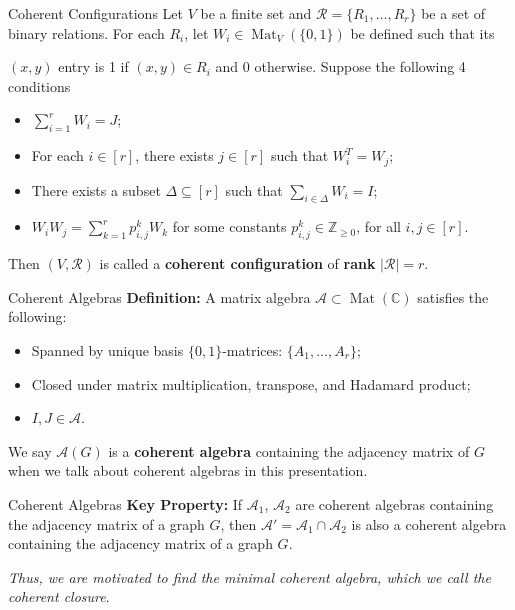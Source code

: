\documentclass{beamer}
\begin{document}
\begin{frame}{Coherent Configurations}
    Let $V$ be a finite set and $\mathcal{R}=\{R_1,\dots,R_r\}$ be a set of binary relations. For each $R_i$, let $W_i\in\operatorname{Mat}_V(\{0,1\})$ be defined such that its 
    
    $(x,y)$ entry is 1 if $(x,y)\in R_i$ and 0 otherwise. Suppose the following 4 conditions

    \vspace{0.8em}
    \begin{itemize}
        \item \( \sum_{i=1}^{r} W_i = J \);
        \item For each \( i \in [r] \), there exists \( j \in [r] \) such that \( W_i^T = W_j \);
        \item There exists a subset \( \Delta \subseteq [r] \) such that \( \sum_{i \in \Delta} W_i = I \);
        \item \( W_i W_j = \sum_{k=1}^{r} p^k_{i,j} W_k \) for some constants \( p^k_{i,j} \in \mathbb{Z}_{\geq 0} \), for all \( i, j \in [r] \).
    \end{itemize}
    
    \vspace{0.8em}
    Then $(V,\mathcal{R})$ is called a \textbf{coherent configuration} of \textbf{rank} $|\mathcal{R}|=r$.
\end{frame}

\begin{frame}{Coherent Algebras}
    \textbf{Definition:} A matrix algebra $\mathcal{A}\subset\operatorname{Mat}(\mathbb{C})$ satisfies the following:
  \begin{itemize}
    \item Spanned by unique basis $\{0,1\}$-matrices: \(\{ A_1, \dots, A_r \}\);
    \item Closed under matrix multiplication, transpose, and Hadamard product;
    \item $I,J\in\mathcal{A}$.
  \end{itemize}

  We say $\mathcal{A}(G)$ is a \textbf{coherent algebra} containing the adjacency matrix of $G$ when we talk about coherent algebras in this presentation.
\end{frame}

\begin{frame}{Coherent Algebras}
    \textbf{Key Property:} If \( \mathcal{A}_1 \), \( \mathcal{A}_2 \) are coherent algebras containing the adjacency matrix of a graph $G$,
    then \(\mathcal{A}' =  \mathcal{A}_1 \cap \mathcal{A}_2 \) is also a coherent algebra containing the adjacency matrix of a graph $G$.
    
    \vspace{1em}
    \textit{Thus, we are motivated to find the minimal coherent algebra, which we call the coherent closure}.
\end{frame}
\end{document}
